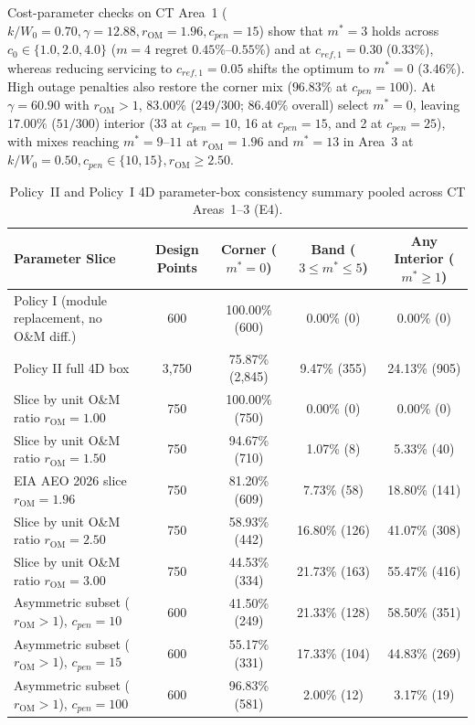 \documentclass{elektr}
\begin{document}
Cost-parameter checks on CT Area~1 ($k/W_0 = 0.70, \gamma = 12.88, r_{\mathrm{OM}} = 1.96, c_{pen} = 15$) show that $m^* = 3$ holds across $c_0 \in \{1.0, 2.0, 4.0\}$ ($m = 4$ regret $0.45\%$--$0.55\%$) and at $c_{ref,1} = 0.30$ ($0.33\%$), whereas reducing servicing to $c_{ref,1} = 0.05$ shifts the optimum to $m^* = 0$ ($3.46\%$). High outage penalties also restore the corner mix ($96.83\%$ at $c_{pen} = 100$). At $\gamma = 60.90$ with $r_{\mathrm{OM}} > 1$, $83.00\%$ ($249/300$; $86.40\%$ overall) select $m^* = 0$, leaving $17.00\%$ ($51/300$) interior (33 at $c_{pen}=10$, 16 at $c_{pen}=15$, and 2 at $c_{pen}=25$), with mixes reaching $m^* = 9$--$11$ at $r_{\mathrm{OM}} = 1.96$ and $m^* = 13$ in Area~3 at $k/W_0 = 0.50, c_{pen} \in \{10, 15\}, r_{\mathrm{OM}} \ge 2.50$.

\begin{table}[!t]
\centering
\scriptsize
\renewcommand{\arraystretch}{0.80}
\caption{Policy~II and Policy~I 4D parameter-box consistency summary pooled across CT Areas~1--3 (E4).}
\label{tab:case_e4_summary}
\begin{tabular*}{\textwidth}{@{\extracolsep{\fill}}lcccc@{}}
\toprule
Parameter Slice & Design Points & Corner ($m^* = 0$) & Band ($3 \le m^* \le 5$) & Any Interior ($m^* \ge 1$) \\
\midrule
Policy I (module replacement, no O\&M diff.) & 600   & 100.00\% (600)  & 0.00\% (0)     & 0.00\% (0) \\
Policy II full 4D box                        & 3,750 & 75.87\% (2,845) & 9.47\% (355)   & 24.13\% (905) \\
\midrule
Slice by unit O\&M ratio $r_{\mathrm{OM}} = 1.00$ & 750 & 100.00\% (750)  & 0.00\% (0)     & 0.00\% (0) \\
Slice by unit O\&M ratio $r_{\mathrm{OM}} = 1.50$ & 750 & 94.67\% (710)   & 1.07\% (8)     & 5.33\% (40) \\
EIA AEO 2026 slice $r_{\mathrm{OM}} = 1.96$       & 750 & 81.20\% (609)   & 7.73\% (58)    & 18.80\% (141) \\
Slice by unit O\&M ratio $r_{\mathrm{OM}} = 2.50$ & 750 & 58.93\% (442)   & 16.80\% (126)  & 41.07\% (308) \\
Slice by unit O\&M ratio $r_{\mathrm{OM}} = 3.00$ & 750 & 44.53\% (334)   & 21.73\% (163)  & 55.47\% (416) \\
\midrule
Asymmetric subset ($r_{\mathrm{OM}} > 1$), $c_{pen} = 10$  & 600 & 41.50\% (249) & 21.33\% (128) & 58.50\% (351) \\
Asymmetric subset ($r_{\mathrm{OM}} > 1$), $c_{pen} = 15$  & 600 & 55.17\% (331) & 17.33\% (104) & 44.83\% (269) \\
Asymmetric subset ($r_{\mathrm{OM}} > 1$), $c_{pen} = 100$ & 600 & 96.83\% (581) & 2.00\% (12)   & 3.17\% (19) \\
\bottomrule
\end{tabular*}
\end{table}
\end{document}
